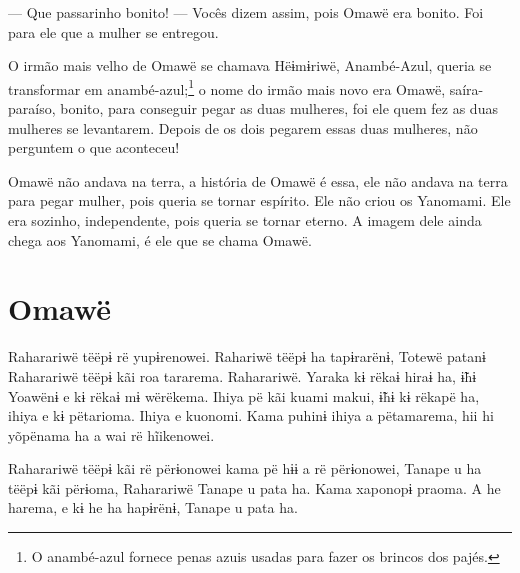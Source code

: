 --- Que passarinho bonito! --- Vocês dizem assim, pois Omawë era bonito.
Foi para ele que a mulher se entregou. 

O irmão mais velho de Omawë se chamava Hëɨmɨriwë, Anambé-Azul, queria se transformar em
anambé-azul;\footnote{O anambé-azul fornece penas azuis usadas para fazer os brincos dos
pajés.} o nome do irmão mais novo era Omawë,
saíra-paraíso, bonito, para conseguir pegar as duas mulheres, foi ele
quem fez as duas mulheres se levantarem. Depois de os dois pegarem essas
duas mulheres, não perguntem o que aconteceu! 


Omawë não andava na terra, a história de Omawë é essa, ele não
andava na terra para pegar mulher, pois queria se tornar espírito. Ele
não criou os Yanomami. Ele era sozinho, independente, pois queria se
tornar eterno. A imagem dele ainda chega aos Yanomami, é ele que se
chama Omawë.

\chapter{Omawë}

  

Raharariwë tëëpɨ rë yupɨrenowei. Rahariwë tëëpɨ ha tapɨrarënɨ, Totewë
patanɨ Raharariwë tëëpɨ kãi roa tararema. Raharariwë. Yaraka kɨ rëkaɨ
hiraɨ ha, ɨ̃hɨ Yoawënɨ e kɨ rëkaɨ mɨ wërëkema. Ihiya pë kãi kuami makui,
ɨ̃hɨ kɨ rëkapë ha, ihiya e kɨ pëtarioma. Ihiya e kuonomi. Kama puhinɨ
ihiya a pëtamarema, hii hi yõpënama ha a wai rë hĩikenowei. 

Raharariwë tëëpɨ kãi rë përɨonowei kama pë hɨɨ a rë përɨonowei, Tanape u
ha tëëpɨ kãi përɨoma, Raharariwë Tanape u pata ha. Kama xaponopɨ praoma.
A he harema, e kɨ he ha hapɨrënɨ, Tanape u pata ha. 


